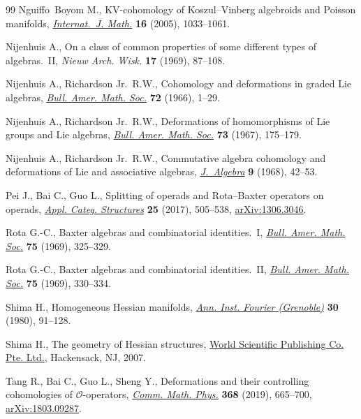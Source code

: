 \documentclass[10pt,a4paper]{amsart}
\numberwithin{equation}{section}
\begin{document}
\begin{thebibliography}{99}
Nguiffo~Boyom M., K{V}-cohomology of {K}oszul--{V}inberg algebroids and
 {P}oisson manifolds, \href{https://doi.org/10.1142/S0129167X0500320X}{\textit{Internat.~J. Math.}} \textbf{16} (2005),
 1033--1061.

Nijenhuis A., On a class of common properties of some different types of
 algebras.~{II}, \textit{Nieuw Arch. Wisk.} \textbf{17} (1969), 87--108.

Nijenhuis A., Richardson Jr.~R.W., Cohomology and deformations in graded {L}ie
 algebras, \href{https://doi.org/10.1090/S0002-9904-1966-11401-5}{\textit{Bull. Amer. Math. Soc.}} \textbf{72} (1966), 1--29.

Nijenhuis A., Richardson Jr.~R.W., Deformations of homomorphisms of {L}ie
 groups and {L}ie algebras, \href{https://doi.org/10.1090/S0002-9904-1967-11703-8}{\textit{Bull. Amer. Math. Soc.}} \textbf{73}
 (1967), 175--179.

Nijenhuis A., Richardson Jr.~R.W., Commutative algebra cohomology and
 deformations of {L}ie and associative algebras, \href{https://doi.org/10.1016/0021-8693(68)90004-5}{\textit{J.~Algebra}}
 \textbf{9} (1968), 42--53.

Pei J., Bai C., Guo L., Splitting of operads and {R}ota--{B}axter operators on
 operads, \href{https://doi.org/10.1007/s10485-016-9431-5}{\textit{Appl. Categ. Structures}} \textbf{25} (2017), 505--538,
 \href{https://arxiv.org/abs/1306.3046}{arXiv:1306.3046}.

Rota G.-C., Baxter algebras and combinatorial identities.~{I}, \href{https://doi.org/10.1090/S0002-9904-1969-12156-7}{\textit{Bull.
 Amer. Math. Soc.}} \textbf{75} (1969), 325--329.

Rota G.-C., Baxter algebras and combinatorial identities.~{II}, \href{https://doi.org/10.1090/S0002-9904-1969-12158-0}{\textit{Bull.
 Amer. Math. Soc.}} \textbf{75} (1969), 330--334.

Shima H., Homogeneous {H}essian manifolds, \href{https://doi.org/10.5802/aif.794}{\textit{Ann. Inst. Fourier
 (Grenoble)}} \textbf{30} (1980), 91--128.

Shima H., The geometry of {H}essian structures, \href{https://doi.org/10.1142/9789812707536}{World Scientific Publishing Co.
 Pte. Ltd.}, Hackensack, NJ, 2007.

Tang R., Bai C., Guo L., Sheng Y., Deformations and their controlling
 cohomologies of {$\mathcal{O}$}-operators, \href{https://doi.org/10.1007/s00220-019-03286-x}{\textit{Comm. Math. Phys.}}
 \textbf{368} (2019), 665--700, \href{https://arxiv.org/abs/1803.09287}{arXiv:1803.09287}.


\end{thebibliography}
\end{document}
